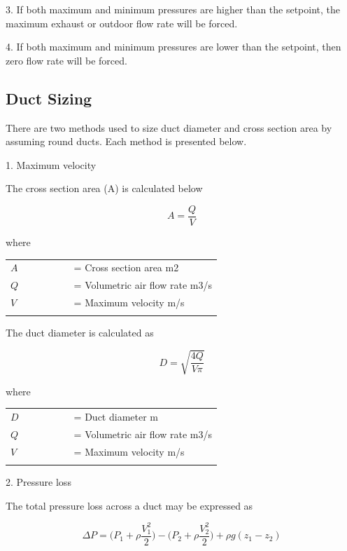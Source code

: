 3. If both maximum and minimum pressures are higher than the setpoint, the maximum exhaust or outdoor flow rate will be forced. 

4. If both maximum and minimum pressures are lower than the setpoint, then zero flow rate will be forced.

\subsection{Duct Sizing}\label{duct-sizingl}

There are two methods used to size duct diameter and cross section area by assuming round ducts. Each method is presented below.

1. Maximum velocity

The cross section area (A) is calculated below

\begin{equation}
A =  \frac{Q}{V} 
\end{equation}

where 

\begin{tabular}{lp{0.7\linewidth}}
\\
$A$ &= Cross section area {m2}\\
$Q$ &= Volumetric air flow rate {m3/s}\\
$V $ &= Maximum velocity {m/s}\\
\\
\end{tabular}

The duct diameter is calculated as

\begin{equation}
D = \sqrt{\frac{4Q}{V \pi } } 
\end{equation}

where

\begin{tabular}{lp{0.7\linewidth}}
\\
$D$ &= Duct diameter {m}\\
$Q$ &= Volumetric air flow rate {m3/s}\\
$V $ &= Maximum velocity {m/s}\\
\\
\end{tabular}


2. Pressure loss

The total pressure loss across a duct may be expressed as

\begin{equation}
\Delta P =  \big( P_{1} +  \rho  \frac{V_{1}^2}{2}  )  - \big( P_{2} +  \rho  \frac{V_{2}^2}{2}  ) +  \rho g(z_{1} - z_{2} ) 
\end{equation}


